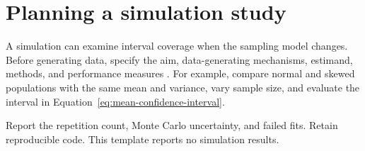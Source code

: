\section{Planning a simulation study}
A simulation can examine interval coverage when the sampling model changes.
Before generating data, specify the aim, data-generating mechanisms, estimand,
methods, and performance measures \citep{morris2019using}. For example,
compare normal and skewed populations with the same mean and variance, vary
sample size, and evaluate the interval in
Equation~\eqref{eq:mean-confidence-interval}.


Report the repetition count, Monte Carlo uncertainty, and failed fits.
Retain reproducible code. This template reports no simulation results.
